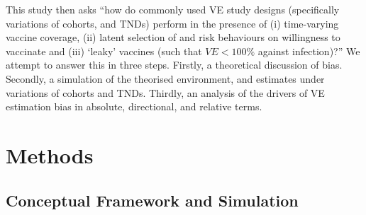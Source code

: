 \documentclass[12pt]{article}
\begin{document}
This study then asks ``how do commonly used VE study designs (specifically variations of cohorts, and TNDs) perform in the presence of (i) time-varying vaccine coverage, (ii) latent selection of and risk behaviours on willingness to vaccinate and (iii) `leaky' vaccines (such that $VE < 100\%$ against infection)?'' We attempt to answer this in three steps. Firstly, a theoretical discussion of bias. Secondly, a simulation of the theorised environment, and estimates under variations of cohorts and TNDs. Thirdly, an analysis of the drivers of VE estimation bias in absolute, directional, and relative terms.

\section{Methods}
\subsection{Conceptual Framework and Simulation}
\end{document}
